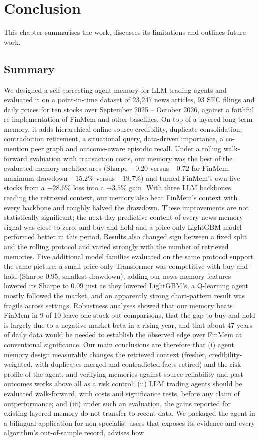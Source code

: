 \chapter{Conclusion}
\label{ch:concl}

This chapter summarises the work, discusses its limitations and outlines future work.

\section{Summary}
We designed a self-correcting agent memory for LLM trading agents and evaluated it on a point-in-time dataset of 23{,}247 news articles, 93 SEC filings and daily prices for ten stocks over September 2025 -- October 2026, against a faithful re-implementation of FinMem and other baselines. On top of a layered long-term memory, it adds hierarchical online source credibility, duplicate consolidation, contradiction retirement, a situational query, data-driven importance, a co-mention peer graph and outcome-aware episodic recall. Under a rolling walk-forward evaluation with transaction costs, our memory was the best of the evaluated memory architectures (Sharpe $-0.20$ versus $-0.72$ for FinMem, maximum drawdown $-15.2\%$ versus $-19.7\%$) and turned FinMem's own five stocks from a $-28.6\%$ loss into a $+3.5\%$ gain. With three LLM backbones reading the retrieved context, our memory also beat FinMem's context with every backbone and roughly halved the drawdown. These improvements are not statistically significant; the next-day predictive content of every news-memory signal was close to zero; and buy-and-hold and a price-only LightGBM model performed better in this period. Results also changed sign between a fixed split and the rolling protocol and varied strongly with the number of retrieved memories. Five additional model families evaluated on the same protocol support the same picture: a small price-only Transformer was competitive with buy-and-hold (Sharpe $0.95$, smallest drawdown), adding our news-memory features lowered its Sharpe to $0.09$ just as they lowered LightGBM's, a Q-learning agent mostly followed the market, and an apparently strong chart-pattern result was fragile across settings. Robustness analyses showed that our memory beats FinMem in 9 of 10 leave-one-stock-out comparisons, that the gap to buy-and-hold is largely due to a negative market beta in a rising year, and that about 47 years of daily data would be needed to establish the observed edge over FinMem at conventional significance. Our main conclusions are therefore that (i) agent memory design measurably changes the retrieved context (fresher, credibility-weighted, with duplicates merged and contradicted facts retired) and the risk profile of the agent, and verifying memories against source reliability and past outcomes works above all as a risk control; (ii) LLM trading agents should be evaluated walk-forward, with costs and significance tests, before any claim of outperformance; and (iii) under such an evaluation, the gains reported for existing layered memory do not transfer to recent data. We packaged the agent in a bilingual application for non-specialist users that exposes its evidence and every algorithm's out-of-sample record, advises how 